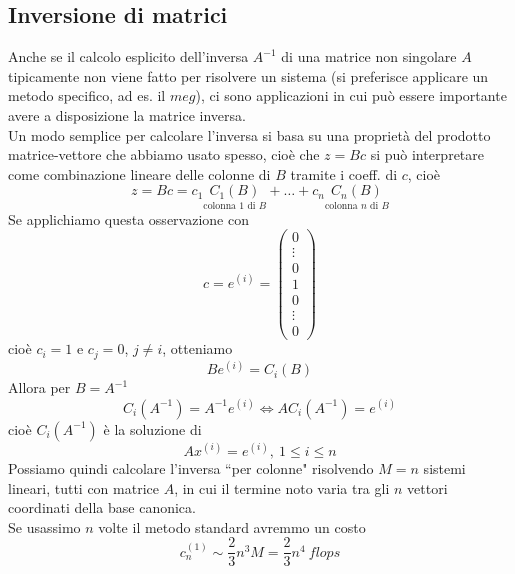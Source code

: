 \documentclass[12pt,a4paper]{article}
\begin{document}
\subsection{Inversione di matrici}
Anche se il calcolo esplicito dell'inversa $A^{-1}$ di una matrice non singolare $A$ tipicamente non viene fatto per risolvere un sistema (si preferisce applicare un metodo specifico, ad es. il $meg$), ci sono applicazioni in cui può essere importante avere a disposizione la matrice inversa. \\
Un modo semplice per calcolare l'inversa si basa su una proprietà del prodotto matrice-vettore che abbiamo usato spesso, cioè che $z=Bc$ si può interpretare come combinazione lineare delle colonne di $B$ tramite i coeff. di $c$, cioè
\begin{equation*}
    z=Bc=c_1\underset{\text{colonna 1 di $B$}}{C_1(B)}+\dots+c_n\underset{\text{colonna $n$ di $B$}}{C_n(B)}
\end{equation*}
Se applichiamo questa osservazione con
\begin{equation*}
    c=e^{(i)}=\begin{pmatrix}
    0 \\
    \vdots \\
    0 \\
    1 \\
    0 \\
    \vdots \\
    0
    \end{pmatrix}
\end{equation*}
cioè $c_i = 1$ e $c_j = 0$, $j \neq i$, otteniamo
\begin{equation*}
    Be^{(i)} = C_i(B)
\end{equation*}
Allora per $B=A^{-1}$
\begin{equation*}
    C_i(A^{-1})=A^{-1}e^{(i)} \Leftrightarrow AC_i(A^{-1})=e^{(i)}
\end{equation*}
cioè $C_i(A^{-1})$ è la soluzione di
\begin{equation*}
    Ax^{(i)} = e^{(i)}, \ 1\leq i \leq n
\end{equation*}
Possiamo quindi calcolare l'inversa ``per colonne" risolvendo $M=n$ sistemi lineari, tutti con matrice $A$, in cui il termine noto varia tra gli $n$ vettori coordinati della base canonica. \\
Se usassimo $n$ volte il metodo standard avremmo un costo
\begin{equation*}
    c_n^{(1)} \sim \frac{2}{3}n^3M = \frac{2}{3}n^4 \ flops
\end{equation*}
\end{document}
